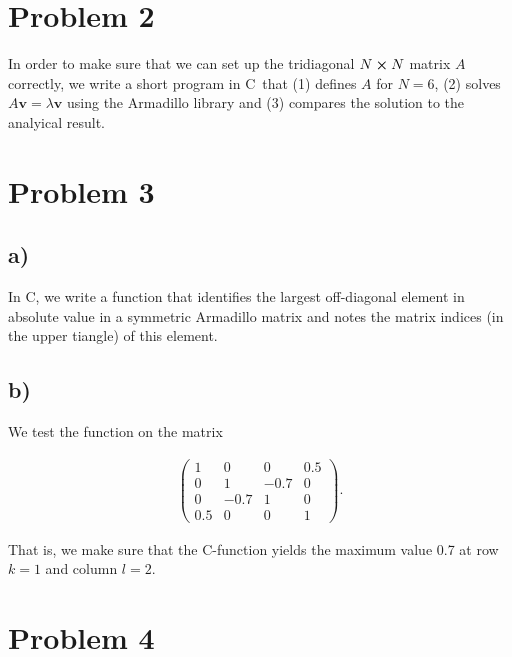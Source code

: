 \documentclass[english,notitlepage,nofootinbib]{revtex4-1}  %
\newcommand{\CC}{C\nolinebreak\hspace{-.05em}\raisebox{.4ex}{\tiny\bf +}\nolinebreak\hspace{-.10em}\raisebox{.4ex}{\tiny\bf +}}
\renewcommand{\vec}{\mathbf}
\begin{document}
\section*{Problem 2}

In order to make sure that we can set up the tridiagonal $N\cross N$ matrix $A$ correctly, we write a short program in \CC\, that (1) defines $A$ for $N=6$, (2) solves $A\vec{v} = \lambda \vec{v}$ using the Armadillo library and (3) compares the solution to the analyical result.


\section*{Problem 3}

\subsection*{a)}

In \CC, we write a function that identifies the largest off-diagonal element in absolute value in a symmetric Armadillo matrix and notes the matrix indices (in the upper tiangle) of this element.

\subsection*{b)}

We test the function on the matrix

\begin{align*}
    \begin{pmatrix}
        1 & 0 & 0 & 0.5 \\
        0 & 1 & -0.7 & 0 \\
        0 & -0.7 & 1 & 0 \\
        0.5 & 0 & 0 & 1
    \end{pmatrix}.
\end{align*}

That is, we make sure that the \CC-function yields the maximum value 0.7 at row $k=1$ and column $l=2$.

\section*{Problem 4}
\end{document}
